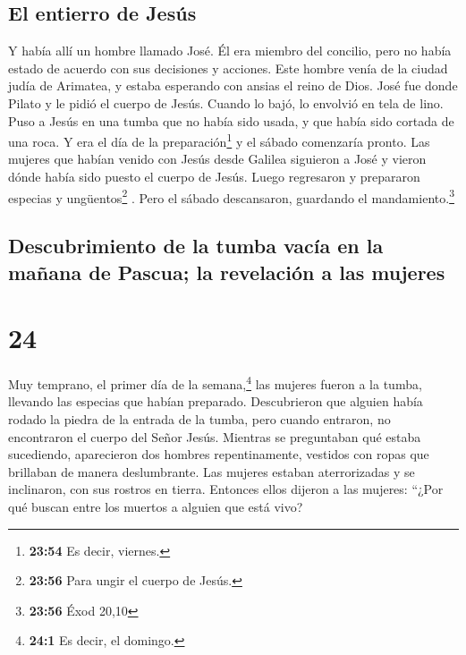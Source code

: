 \hypertarget{el-entierro-de-jesuxfas}{%
\subsection{El entierro de Jesús}\label{el-entierro-de-jesuxfas}}

 Y había allí un hombre llamado José. Él era miembro del
concilio,  pero no había estado de acuerdo con sus
decisiones y acciones. Este hombre venía de la ciudad judía de Arimatea,
y estaba esperando con ansias el reino de Dios.  José fue
donde Pilato y le pidió el cuerpo de Jesús.  Cuando lo
bajó, lo envolvió en tela de lino. Puso a Jesús en una tumba que no
había sido usada, y que había sido cortada de una roca. 
Y era el día de la preparación\footnote{\textbf{23:54} Es decir,
  viernes.} y el sábado comenzaría pronto.  Las mujeres
que habían venido con Jesús desde Galilea siguieron a José y vieron
dónde había sido puesto el cuerpo de Jesús.  Luego
regresaron y prepararon especias y ungüentos\footnote{\textbf{23:56}
  Para ungir el cuerpo de Jesús.} . Pero el sábado descansaron,
guardando el mandamiento.\footnote{\textbf{23:56} Éxod 20,10}

\hypertarget{descubrimiento-de-la-tumba-vacuxeda-en-la-mauxf1ana-de-pascua-la-revelaciuxf3n-a-las-mujeres}{%
\subsection{Descubrimiento de la tumba vacía en la mañana de Pascua; la
revelación a las
mujeres}\label{descubrimiento-de-la-tumba-vacuxeda-en-la-mauxf1ana-de-pascua-la-revelaciuxf3n-a-las-mujeres}}

\hypertarget{section-23}{%
\section{24}\label{section-23}}

 Muy temprano, el primer día de la semana,\footnote{\textbf{24:1}
  Es decir, el domingo.} las mujeres fueron a la tumba, llevando las
especias que habían preparado.  Descubrieron que alguien
había rodado la piedra de la entrada de la tumba,  pero
cuando entraron, no encontraron el cuerpo del Señor Jesús.
 Mientras se preguntaban qué estaba sucediendo,
aparecieron dos hombres repentinamente, vestidos con ropas que brillaban
de manera deslumbrante.  Las mujeres estaban aterrorizadas
y se inclinaron, con sus rostros en tierra. Entonces ellos dijeron a las
mujeres: ``¿Por qué buscan entre los muertos a alguien que está vivo?

